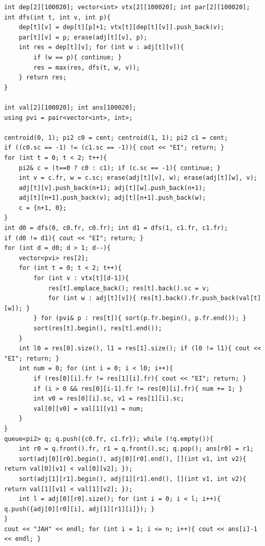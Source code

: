 \begin{verbatim}
int dep[2][100020]; vector<int> vtx[2][100020]; int par[2][100020];
int dfs(int t, int v, int p){
	dep[t][v] = dep[t][p]+1; vtx[t][dep[t][v]].push_back(v);
	par[t][v] = p; erase(adj[t][v], p);
	int res = dep[t][v]; for (int w : adj[t][v]){
		if (w == p){ continue; }
		res = max(res, dfs(t, w, v));
	} return res;
}

int val[2][100020]; int ans[100020];
using pvi = pair<vector<int>, int>;

centroid(0, 1); pi2 c0 = cent; centroid(1, 1); pi2 c1 = cent;
if ((c0.sc == -1) != (c1.sc == -1)){ cout << "EI"; return; }
for (int t = 0; t < 2; t++){
	pi2& c = (t==0 ? c0 : c1); if (c.sc == -1){ continue; }
	int v = c.fr, w = c.sc; erase(adj[t][v], w); erase(adj[t][w], v);
	adj[t][v].push_back(n+1); adj[t][w].push_back(n+1);
	adj[t][n+1].push_back(v); adj[t][n+1].push_back(w);
	c = {n+1, 0};
}
int d0 = dfs(0, c0.fr, c0.fr); int d1 = dfs(1, c1.fr, c1.fr);
if (d0 != d1){ cout << "EI"; return; }
for (int d = d0; d > 1; d--){
	vector<pvi> res[2];
	for (int t = 0; t < 2; t++){
		for (int v : vtx[t][d-1]){
			res[t].emplace_back(); res[t].back().sc = v;
			for (int w : adj[t][v]){ res[t].back().fr.push_back(val[t][w]); }
		} for (pvi& p : res[t]){ sort(p.fr.begin(), p.fr.end()); }
		sort(res[t].begin(), res[t].end());
	}
	int l0 = res[0].size(), l1 = res[1].size(); if (l0 != l1){ cout << "EI"; return; }
	int num = 0; for (int i = 0; i < l0; i++){
		if (res[0][i].fr != res[1][i].fr){ cout << "EI"; return; }
		if (i > 0 && res[0][i-1].fr != res[0][i].fr){ num += 1; }
		int v0 = res[0][i].sc, v1 = res[1][i].sc;
		val[0][v0] = val[1][v1] = num;
	}
}
queue<pi2> q; q.push({c0.fr, c1.fr}); while (!q.empty()){
	int r0 = q.front().fr, r1 = q.front().sc; q.pop(); ans[r0] = r1;
	sort(adj[0][r0].begin(), adj[0][r0].end(), [](int v1, int v2){ return val[0][v1] < val[0][v2]; });
	sort(adj[1][r1].begin(), adj[1][r1].end(), [](int v1, int v2){ return val[1][v1] < val[1][v2]; });
	int l = adj[0][r0].size(); for (int i = 0; i < l; i++){ q.push({adj[0][r0][i], adj[1][r1][i]}); }
}
cout << "JAH" << endl; for (int i = 1; i <= n; i++){ cout << ans[i]-1 << endl; }
\end{verbatim}